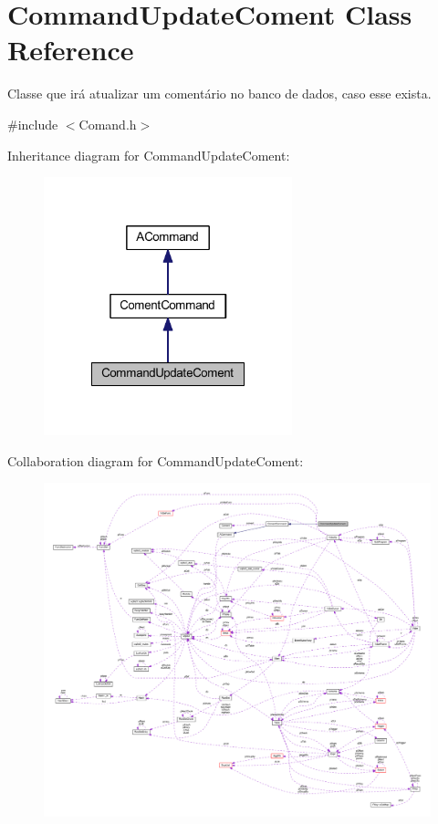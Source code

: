 \hypertarget{class_command_update_coment}{\section{Command\-Update\-Coment Class Reference}
\label{class_command_update_coment}
}


Classe que irá atualizar um comentário no banco de dados, caso esse exista.  




{\ttfamily \#include $<$Comand.\-h$>$}



Inheritance diagram for Command\-Update\-Coment\-:\nopagebreak
\begin{figure}[H]
\begin{center}
\leavevmode
\includegraphics[width=204pt]{class_command_update_coment__inherit__graph}
\end{center}
\end{figure}


Collaboration diagram for Command\-Update\-Coment\-:\nopagebreak
\begin{figure}[H]
\begin{center}
\leavevmode
\includegraphics[width=350pt]{class_command_update_coment__coll__graph}
\end{center}
\end{figure}
